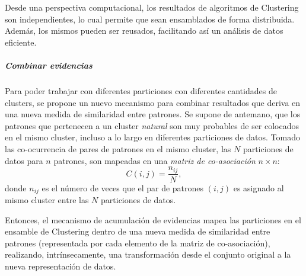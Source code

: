 \bigskip Desde una perspectiva computacional, los resultados de algoritmos de Clustering son independientes, lo cual permite que sean ensamblados de forma distribuida. Además, los mismos pueden ser reusados, facilitando así un análisis de datos eficiente.

\subparagraph{Combinar evidencias}
Para poder trabajar con diferentes particiones con diferentes cantidades de clusters, se propone un nuevo mecanismo para combinar resultados que deriva en una nueva medida de similaridad entre patrones. Se supone de antemano, que los patrones que pertenecen a un cluster \textit{natural} son muy probables de ser colocados en el mismo cluster, incluso a lo largo en diferentes particiones de datos. Tomado las co-ocurrencia de pares de patrones en el mismo cluster, las \(N\) particiones de datos para \(n\) patrones, son mapeadas en una \textit{matriz de co-asociación} \(n \times n\):
\[C(i,j)=\frac{n_{ij}}{N},\]
donde \(n_{ij}\) es el número de veces que el par de patrones \((i,j)\) es asignado al mismo cluster entre las \(N\) particiones de datos.

\bigskip Entonces, el mecanismo de acumulación de evidencias mapea las particiones en el ensamble de Clustering dentro de una nueva medida de similaridad entre patrones (representada por cada elemento de la matriz de co-asociación), realizando, intrínsecamente, una transformación desde el conjunto original a la nueva representación de datos.
